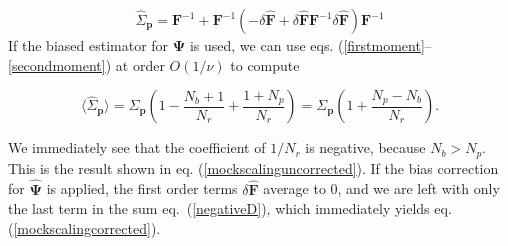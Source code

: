 \documentclass[reprint,aps,prd,superscriptaddress,showkeys,showpacs]{revtex4-1}
\newcommand{\bb}[1]{\mathbf{#1}}
\newcommand{\bbh}[1]{\mathbf{\hat{#1}}}
\newcommand{\h}[1]{\hat{#1}}
\begin{document}
\begin{equation}
\h{\Sigma}_\bb{p} = \bb{F}^{-1} + \bb{F}^{-1}\left(- \delta{\bbh{F}}+ \delta{\bbh{F}}\bb{F}^{-1}\delta{\bbh{F}}\right)\bb{F}^{-1}  
\end{equation}  
%
If the biased estimator for $\bbh{\Psi}$ is used, we can use eqs. (\ref{firstmoment}--\ref{secondmoment}) at order $O(1/\nu)$ to compute 
\begin{widetext}
\begin{equation}
\label{negativeD}
\langle\h{\Sigma}_\bb{p}\rangle = \Sigma_\bb{p}\left(1-\frac{N_b+1}{N_r}+\frac{1+N_p}{N_r}\right) = \Sigma_\bb{p}\left(1+\frac{N_p-N_b}{N_r}\right).
\end{equation}
\end{widetext}
%
We immediately see that the coefficient of $1/N_r$ is negative, because $N_b>N_p$. This is the result shown in eq. (\ref{mockscalinguncorrected}). If the bias correction for $\bbh{\Psi}$ is applied, the first order terms $\delta{\bbh{F}}$ average to 0, and we are left with only the last term in the sum eq.~(\ref{negativeD}), which immediately yields eq. (\ref{mockscalingcorrected}). 


\label{lastpage}
\end{document}
